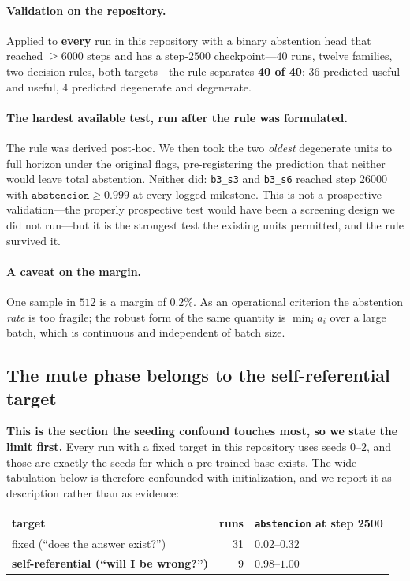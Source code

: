 \documentclass[11pt]{article}
\begin{document}
\paragraph{Validation on the repository.} Applied to \textbf{every} run in this repository with a
binary abstention head that reached $\geq 6000$ steps and has a step-$2500$ checkpoint---$40$ runs,
twelve families, two decision rules, both targets---the rule separates \textbf{40 of 40}: $36$
predicted useful and useful, $4$ predicted degenerate and degenerate.

\paragraph{The hardest available test, run after the rule was formulated.} The rule was derived
post-hoc. We then took the two \emph{oldest} degenerate units to full horizon under the original
flags, pre-registering the prediction that neither would leave total abstention. Neither did:
\texttt{b3\_s3} and \texttt{b3\_s6} reached step $26000$ with $\texttt{abstencion} \geq 0.999$ at
every logged milestone. This is not a prospective validation---the properly prospective test would
have been a screening design we did not run---but it is the strongest test the existing units
permitted, and the rule survived it.

\paragraph{A caveat on the margin.} One sample in $512$ is a margin of $0.2\%$. As an operational
criterion the abstention \emph{rate} is too fragile; the robust form of the same quantity is
$\min_i a_i$ over a large batch, which is continuous and independent of batch size.

\subsection{The mute phase belongs to the self-referential target}
\label{sec:exclusiva}

\textbf{This is the section the seeding confound touches most, so we state the limit first.} Every
run with a fixed target in this repository uses seeds $0$--$2$, and those are exactly the seeds for
which a pre-trained base exists. The wide tabulation below is therefore confounded with
initialization, and we report it as description rather than as evidence:

\begin{center}
\begin{tabular}{lrl}
\toprule
target & runs & \texttt{abstencion} at step 2500 \\
\midrule
fixed (``does the answer exist?'') & 31 & $0.02$--$0.32$ \\
\textbf{self-referential (``will I be wrong?'')} & 9 & $\mathbf{0.98}$--$\mathbf{1.00}$ \\
\bottomrule
\end{tabular}
\end{center}
\end{document}
